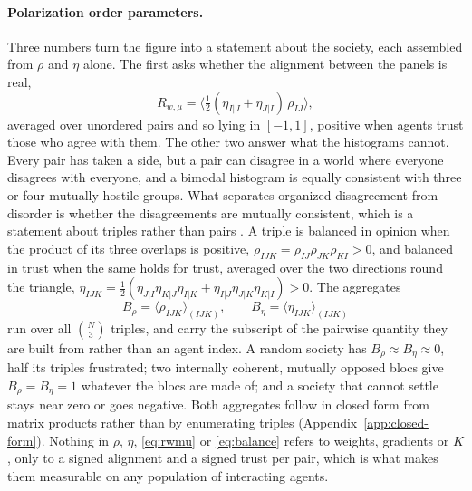 \documentclass{article}
\newcommand{\Rwmu}{R_{w,\mu}}
\newcommand{\Brho}{B_{\rho}}
\newcommand{\Beta}{B_{\eta}}
\begin{document}
\paragraph{Polarization order parameters.} Three numbers turn the figure into a
statement about the society, each assembled from $\rho$ and $\eta$ alone. The first
asks whether the alignment between the panels is real,
%
\begin{equation}
  \Rwmu = \bigl\langle \tfrac{1}{2}(\eta_{I|J}+\eta_{J|I})\,\rho_{IJ} \bigr\rangle,
  \label{eq:rwmu}
\end{equation}
%
averaged over unordered pairs and so lying in $[-1,1]$, positive when agents trust
those who agree with them. The other two answer what the histograms cannot. Every
pair has taken a side, but a pair can disagree in a world where everyone disagrees
with everyone, and a bimodal histogram is equally consistent with three or four
mutually hostile groups. What separates organized disagreement from disorder is
whether the disagreements are mutually consistent, which is a statement about triples
rather than pairs \citep{heider1946attitudes,cartwright1956structural}. A triple is
balanced in opinion when the product of its three overlaps is positive,
$\rho_{IJK}=\rho_{IJ}\rho_{JK}\rho_{KI}>0$, and balanced in trust when the same holds
for trust, averaged over the two directions round the triangle,
$\eta_{IJK}=\tfrac{1}{2}(\eta_{J|I}\eta_{K|J}\eta_{I|K}+\eta_{I|J}\eta_{J|K}\eta_{K|I})>0$.
The aggregates
%
\begin{equation}
  \Brho = \bigl\langle \rho_{IJK}\bigr\rangle_{(IJK)},
  \qquad
  \Beta = \bigl\langle \eta_{IJK}\bigr\rangle_{(IJK)}
  \label{eq:balance}
\end{equation}
%
run over all $\binom{N}{3}$ triples, and carry the subscript of the pairwise quantity
they are built from rather than an agent index. A random society has
$\Brho\approx\Beta\approx0$, half its triples frustrated; two internally coherent,
mutually opposed blocs give $\Brho=\Beta=1$ whatever the blocs are made of; and a society
that cannot settle stays near zero or goes negative. Both aggregates follow in closed
form from matrix products rather than by enumerating triples
(Appendix~\ref{app:closed-form}). Nothing in $\rho$, $\eta$, \eqref{eq:rwmu} or
\eqref{eq:balance} refers to weights, gradients or $K$, only to a signed alignment and a signed trust
per pair, which is what makes them measurable on any population of interacting
agents.
\end{document}
